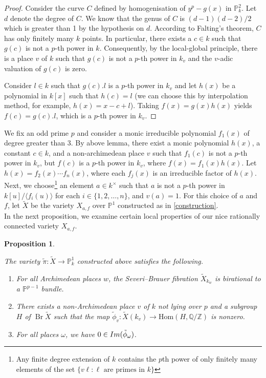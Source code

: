 \documentclass[11pt]{amsart}
\theoremstyle{plain}
\newtheorem{proposition}[thm]{Proposition}
\theoremstyle{definition}
\newcommand{\im}{{\rm Im}}
\renewcommand{\P}{{\mathbb P}}
\DeclareMathOperator{\Br}{Br}
\begin{document}
\begin{proof}
    Consider the curve $C$ defined by homogenisation of $y^p-g(x)$ in $\P^{2}_k$. Let $d$ denote the degree of $C$. We know that the genus of $C$ is $(d-1)(d-2)/2$ \cite[Proposition 2.15]{rm} which is greater than 1 by the hypothesis on $d$. According to Falting's theorem, $C$ has only finitely many $k$ points. In particular, there exists a $c\in k$ such that $g(c)$ is not a $p$-th power in $k$. Consequently, by the local-global principle, there is a place $v$ of $k$ such that $g(c)$ is not a $p$-th power in $k_v$ and the $v$-adic valuation of $g(c)$ is zero.

    Consider $l\in k$ such that $g(c).l$ is a $p$-th power in $k_v$ and let $h(x)$ be a polynomial in $k[x]$ such that $h(c)=l$ (we can choose this by interpolation method, for example, $h(x)=x-c+l$). Taking $f(x)=g(x)h(x)$ yields $f(c)=g(c).l$, which is a $p$-th power in $k_v$.
\end{proof}

We fix an odd prime \( p \) and consider a monic irreducible polynomial \( f_1(x) \) of degree greater than 3. By above lemma, there exist a monic polynomial \(h(x) \), a constant \( c \in k \), and a non-archimedean place \( v \) such that \( f_1(c) \) is not a \( p \)-th power in \( k_v \), but \( f(c) \) is a \( p \)-th power in \( k_v \), where \( f(x) = f_1(x)h(x) \). Let \( h(x) = f_2(x) \cdots f_n(x) \), where each \( f_j(x) \)  is an irreducible factor of \( h(x) \). Next, we choose\footnote{Any finite degree extension of $k$ contains the $p$th power of only finitely many elements of the set $\{v\ell: \ell \text{ are primes in } k\}$} an element \( a \in k^\times \) such that \( a \) is not a \( p \)-th power in \( k[u]/\langle f_i(u) \rangle \) for each \( i \in \{1, 2, \dots, n\} \), and \( v(a) = 1 \). For this choice of \( a \) and \( f \), let \(\tilde{X}\) be the variety \( X_{a,f} \) over \(\mathbb{P}^1\) constructed as in \ref{construction}.  \\
In the next proposition, we examine certain local properties of our nice rationally connected variety \( X_{a,f} \).

	\begin{proposition}\label{Main lemma}
		
		
		The variety $\tilde{\pi} : \tilde{X} \to \mathbb{P}_k^1$ constructed above satisfies the following.
		
		\begin{enumerate}[label=\arabic*.]
			\item For all Archimedean places $w$, the Severi--Brauer fibration $\tilde{X}_{k_w}$ is birational to a $\mathbb{P}^{p-1}$ bundle.
			\item There exists a non-Archimedean place $v$ of $k$ not lying over $p$ and a subgroup $H$ of $\Br\tilde{X}$ such that the map $\tilde{\phi}_{v} : \tilde{X}(k_{v}) \to \mathrm{Hom}(H, \mathbb{Q}/\mathbb{Z})$ is nonzero.
			\item For all places $\omega$, we have $0 \in \im (\tilde{\phi}_{\omega})$.	
		\end{enumerate}
		
	\end{proposition}
	
\end{document}
